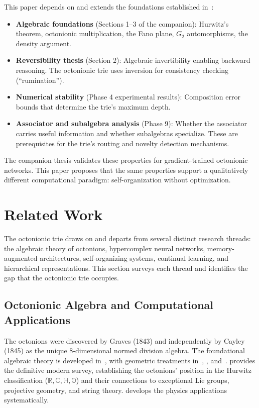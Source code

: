 \documentclass[11pt,a4paper]{article}
\theoremstyle{definition}
\theoremstyle{remark}
\newcommand{\Oct}{\mathbb{O}}
\newcommand{\Real}{\mathbb{R}}
\newcommand{\Comp}{\mathbb{C}}
\newcommand{\Quat}{\mathbb{H}}
\begin{document}
This paper depends on and extends the foundations established in~\citet{Escalera2026}:
\begin{itemize}[nosep]
  \item \textbf{Algebraic foundations} (Sections 1--3 of the companion): Hurwitz's theorem, octonionic multiplication, the Fano plane, $G_2$ automorphisms, the density argument.
  \item \textbf{Reversibility thesis} (Section 2): Algebraic invertibility enabling backward reasoning. The octonionic trie uses inversion for consistency checking (``rumination'').
  \item \textbf{Numerical stability} (Phase 4 experimental results): Composition error bounds that determine the trie's maximum depth.
  \item \textbf{Associator and subalgebra analysis} (Phase 9): Whether the associator carries useful information and whether subalgebras specialize. These are prerequisites for the trie's routing and novelty detection mechanisms.
\end{itemize}

The companion thesis validates these properties for gradient-trained octonionic networks. This paper proposes that the same properties support a qualitatively different computational paradigm: self-organization without optimization.

\section{Related Work}
\label{sec:related-work}

The octonionic trie draws on and departs from several distinct research threads: the algebraic theory of octonions, hypercomplex neural networks, memory-augmented architectures, self-organizing systems, continual learning, and hierarchical representations. This section surveys each thread and identifies the gap that the octonionic trie occupies.

\subsection{Octonionic Algebra and Computational Applications}

The octonions were discovered by Graves (1843) and independently by Cayley (1845) as the unique 8-dimensional normed division algebra. The foundational algebraic theory is developed in~\citet{Schafer1966}, with geometric treatments in~\citet{Conway2003}, \citet{Springer2000}, and~\citet{DrayManogue2015}. \citet{Baez2002} provides the definitive modern survey, establishing the octonions' position in the Hurwitz classification ($\Real, \Comp, \Quat, \Oct$) and their connections to exceptional Lie groups, projective geometry, and string theory. \citet{Okubo1995} develops the physics applications systematically.
\end{document}
